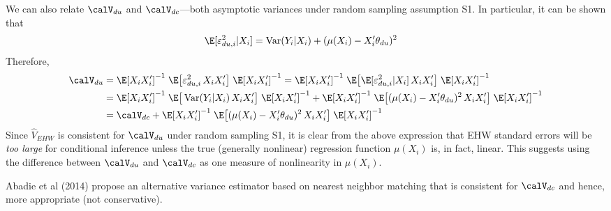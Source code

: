 \documentclass[12pt]{article}
\theoremstyle{plain}
\theoremstyle{definition}
\theoremstyle{remark}
\newcommand{\Var}{\operatorname{Var}}
\begin{document}
We can also relate $\calV_{du}$ and $\calV_{dc}$---both asymptotic
variances under random sampling assumption S1.
In particular, it can be shown that
\begin{align*}
  \E[\varepsilon^2_{du,i}|X_i]
  &=
  \Var(Y_i|X_i) + (\mu(X_i)-X_i'{\theta}_{du})^2
\end{align*}
Therefore,
\begin{align*}
  \calV_{du}
  &=
  \E[X_iX_i']^{-1}
  \;
  \E\big[\varepsilon^2_{du,i}\,X_iX_i'\big]
  \;
  \E[X_iX_i']^{-1}
  =
  \E[X_iX_i']^{-1}
  \;
  \E\big[\E[\varepsilon^2_{du,i}|X_i]\,X_iX_i'\big]
  \;
  \E[X_iX_i']^{-1}
  \\
  &=
  \E[X_iX_i']^{-1}
  \;
  \E\big[\Var(Y_i|X_i)\,X_iX_i'\big]
  \;
  \E[X_iX_i']^{-1}
  +
  \E[X_iX_i']^{-1}
  \;
  \E\big[(\mu(X_i)-X_i'\theta_{du})^2\,X_iX_i'\big]
  \;
  \E[X_iX_i']^{-1}
  \\
  &=
  \calV_{dc}
  +
  \E[X_iX_i']^{-1}
  \;
  \E\big[(\mu(X_i)-X_i'\theta_{du})^2\,X_iX_i'\big]
  \;
  \E[X_iX_i']^{-1}
\end{align*}
Since $\hat{V}_{EHW}$ is consistent for $\calV_{du}$ under random
sampling S1, it is clear from the above expression that
EHW standard errors will be \emph{too large} for conditional inference
unless the true (generally nonlinear) regression function $\mu(X_i)$ is,
in fact, linear.
This suggests using the difference between $\calV_{du}$ and
$\calV_{dc}$ as one measure of nonlinearity in $\mu(X_i)$.

Abadie et al (2014) propose an alternative variance estimator based on
nearest neighbor matching that is consistent for $\calV_{dc}$ and hence,
more appropriate (not conservative).
\end{document}
